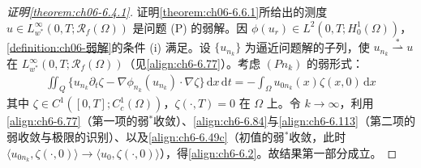 \documentclass[../../main.tex]{subfiles}%
\begin{document}
\begin{proof}[证明\cref{theorem:ch06-6.4.1}]
证明\cref{theorem:ch06-6.6.1}所给出的测度 $u\in L^\infty_{w^*}(0,T;\mathscr{R}_f(\Omega))$ 是问题 (P) 的弱解。因 $\phi(u_r)\in L^2(0,T;H^1_0(\Omega))$，\cref{definition:ch06-弱解}的条件 (i) 满足。设 $\{u_{n_k}\}$ 为逼近问题解的子列，使 $u_{n_k}\stackrel{*}{\rightharpoonup}u$ 在 $L^\infty_{w^*}(0,T;\mathscr{R}_f(\Omega))$（见\eqref{align:ch6-6.77}）。考虑 $(Pn_k)$ 的弱形式：
\begin{align*}
\iint_Q\{u_{n_k}\partial_t\zeta-\nabla\phi_{n_k}(u_{n_k})\cdot\nabla\zeta\}\,\mathrm{d}x\,\mathrm{d}t
=-\int_\Omega u_{0n_k}(x)\zeta(x,0)\,\mathrm{d}x
\end{align*}
其中 $\zeta\in C^1([0,T];C^1_c(\Omega))$，$\zeta(\cdot,T)=0$ 在 $\Omega$ 上。令 $k\to\infty$，利用\eqref{align:ch6-6.77}（第一项的弱$^*$收敛）、\eqref{align:ch6-6.84}与\eqref{align:ch6-6.113}（第二项的弱收敛与极限的识别）、以及\eqref{align:ch6-6.49c}（初值的弱$^*$收敛，此时 $\langle u_{0n_k},\zeta(\cdot,0)\rangle\to\langle u_0,\zeta(\cdot,0)\rangle$），得\eqref{align:ch6-6.2}。故结果第一部分成立。


\end{proof}
\end{document}
